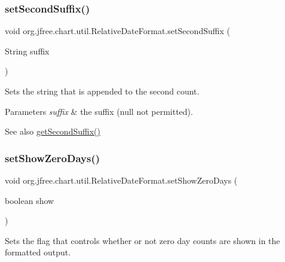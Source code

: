 \subsubsection{\texorpdfstring{set\+Second\+Suffix()}{setSecondSuffix()}}
{\footnotesize\ttfamily void org.\+jfree.\+chart.\+util.\+Relative\+Date\+Format.\+set\+Second\+Suffix (\begin{DoxyParamCaption}\item[{String}]{suffix }\end{DoxyParamCaption})}

Sets the string that is appended to the second count.


\begin{DoxyParams}{Parameters}
{\em suffix} & the suffix ({\ttfamily null} not permitted).\\
\hline
\end{DoxyParams}
\begin{DoxySeeAlso}{See also}
\mbox{\hyperlink{classorg_1_1jfree_1_1chart_1_1util_1_1_relative_date_format_a107f720128aa5e6b20d710a5ea227c09}{get\+Second\+Suffix()}} 
\end{DoxySeeAlso}
\mbox{\label{classorg_1_1jfree_1_1chart_1_1util_1_1_relative_date_format_a04513ebddae696114b47f23d38fcd5f6}} 
\subsubsection{\texorpdfstring{set\+Show\+Zero\+Days()}{setShowZeroDays()}}
{\footnotesize\ttfamily void org.\+jfree.\+chart.\+util.\+Relative\+Date\+Format.\+set\+Show\+Zero\+Days (\begin{DoxyParamCaption}\item[{boolean}]{show }\end{DoxyParamCaption})}

Sets the flag that controls whether or not zero day counts are shown in the formatted output.



